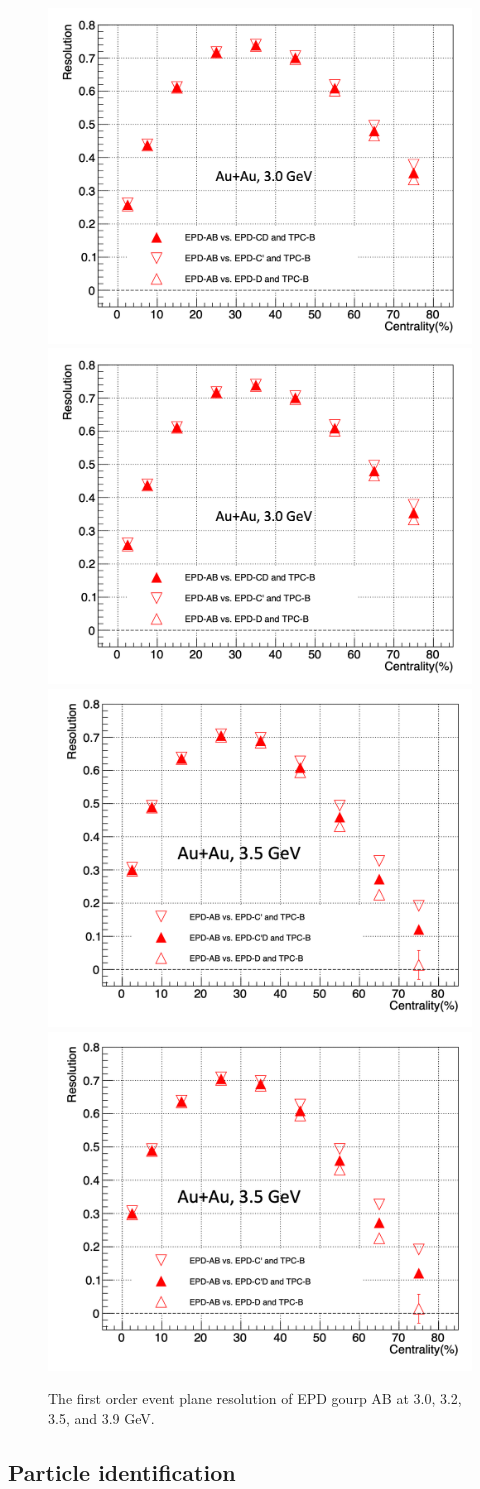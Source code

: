 \begin{figure}[hbt!]
\centering
\includegraphics[width=0.45\linewidth]{figures/chapter02/res_3gev.png}
\includegraphics[width=0.45\linewidth]{figures/chapter02/res_3gev.png}
\includegraphics[width=0.45\linewidth]{figures/chapter02/res_3p5gev.png}
\includegraphics[width=0.45\linewidth]{figures/chapter02/res_3p5gev.png}
\caption{The first order event plane resolution of EPD gourp AB at 3.0, 3.2, 3.5, and 3.9 GeV.}
\label{fig:1st_resolution}
\end{figure}

\subsection{Particle identification}

